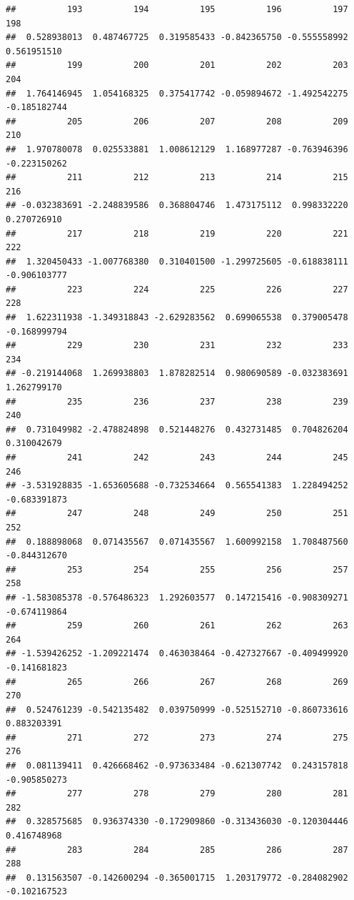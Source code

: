 \documentclass[
]{article}
\begin{document}
\begin{verbatim}
##          193          194          195          196          197          198 
##  0.528938013  0.487467725  0.319585433 -0.842365750 -0.555558992  0.561951510 
##          199          200          201          202          203          204 
##  1.764146945  1.054168325  0.375417742 -0.059894672 -1.492542275 -0.185182744 
##          205          206          207          208          209          210 
##  1.970780078  0.025533881  1.008612129  1.168977287 -0.763946396 -0.223150262 
##          211          212          213          214          215          216 
## -0.032383691 -2.248839586  0.368804746  1.473175112  0.998332220  0.270726910 
##          217          218          219          220          221          222 
##  1.320450433 -1.007768380  0.310401500 -1.299725605 -0.618838111 -0.906103777 
##          223          224          225          226          227          228 
##  1.622311938 -1.349318843 -2.629283562  0.699065538  0.379005478 -0.168999794 
##          229          230          231          232          233          234 
## -0.219144068  1.269938803  1.878282514  0.980690589 -0.032383691  1.262799170 
##          235          236          237          238          239          240 
##  0.731049982 -2.478824898  0.521448276  0.432731485  0.704826204  0.310042679 
##          241          242          243          244          245          246 
## -3.531928835 -1.653605688 -0.732534664  0.565541383  1.228494252 -0.683391873 
##          247          248          249          250          251          252 
##  0.188898068  0.071435567  0.071435567  1.600992158  1.708487560 -0.844312670 
##          253          254          255          256          257          258 
## -1.583085378 -0.576486323  1.292603577  0.147215416 -0.908309271 -0.674119864 
##          259          260          261          262          263          264 
## -1.539426252 -1.209221474  0.463038464 -0.427327667 -0.409499920 -0.141681823 
##          265          266          267          268          269          270 
##  0.524761239 -0.542135482  0.039750999 -0.525152710 -0.860733616  0.883203391 
##          271          272          273          274          275          276 
##  0.081139411  0.426668462 -0.973633484 -0.621307742  0.243157818 -0.905850273 
##          277          278          279          280          281          282 
##  0.328575685  0.936374330 -0.172909860 -0.313436030 -0.120304446  0.416748968 
##          283          284          285          286          287          288 
##  0.131563507 -0.142600294 -0.365001715  1.203179772 -0.284082902 -0.102167523 

\end{verbatim}
\end{document}
